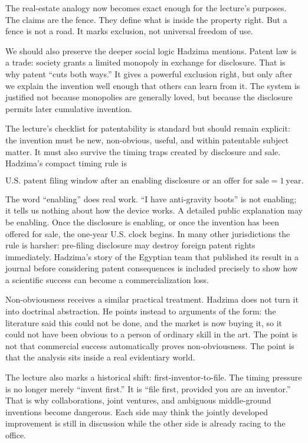 The real-estate analogy now becomes exact enough for the lecture's purposes. The claims are the fence. They define what is inside the property right. But a fence is not a road. It marks exclusion, not universal freedom of use.

We should also preserve the deeper social logic Hadzima mentions. Patent law is a trade: society grants a limited monopoly in exchange for disclosure. That is why patent ``cuts both ways.'' It gives a powerful exclusion right, but only after we explain the invention well enough that others can learn from it. The system is justified not because monopolies are generally loved, but because the disclosure permits later cumulative invention.

The lecture's checklist for patentability is standard but should remain explicit: the invention must be new, non-obvious, useful, and within patentable subject matter. It must also survive the timing traps created by disclosure and sale. Hadzima's compact timing rule is

\begin{equation}
\text{U.S. patent filing window after an enabling disclosure or an offer for sale}=1\ \text{year}.
\end{equation}

The word ``enabling'' does real work. ``I have anti-gravity boots'' is not enabling; it tells us nothing about how the device works. A detailed public explanation may be enabling. Once the disclosure is enabling, or once the invention has been offered for sale, the one-year U.S. clock begins. In many other jurisdictions the rule is harsher: pre-filing disclosure may destroy foreign patent rights immediately. Hadzima's story of the Egyptian team that published its result in a journal before considering patent consequences is included precisely to show how a scientific success can become a commercialization loss.

Non-obviousness receives a similar practical treatment. Hadzima does not turn it into doctrinal abstraction. He points instead to arguments of the form: the literature said this could not be done, and the market is now buying it, so it could not have been obvious to a person of ordinary skill in the art. The point is not that commercial success automatically proves non-obviousness. The point is that the analysis sits inside a real evidentiary world.

The lecture also marks a historical shift: first-inventor-to-file. The timing pressure is no longer merely ``invent first.'' It is ``file first, provided you are an inventor.'' That is why collaborations, joint ventures, and ambiguous middle-ground inventions become dangerous. Each side may think the jointly developed improvement is still in discussion while the other side is already racing to the office.

